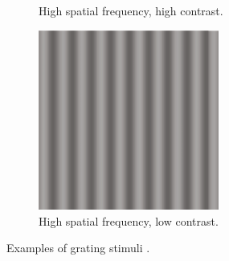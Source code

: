 \begin{figure}[!htp]
\begin{subfigure}[t]{0.3\textwidth}
        \caption{High spatial frequency, high contrast.}
    \end{subfigure}
    \hspace{0.03\textwidth}
    \begin{subfigure}[t]{0.3\textwidth}
        \centering
        \includegraphics[width=0.65\textwidth]{assets/images/grating-stimuli/3.png}
        \caption{High spatial frequency, low contrast.}
    \end{subfigure}
    \caption[Examples of grating stimuli]{Examples of grating stimuli \cite{KandelBook2003:26}.}
    \label{fig:grating-stimuli-examples}
\end{figure}
